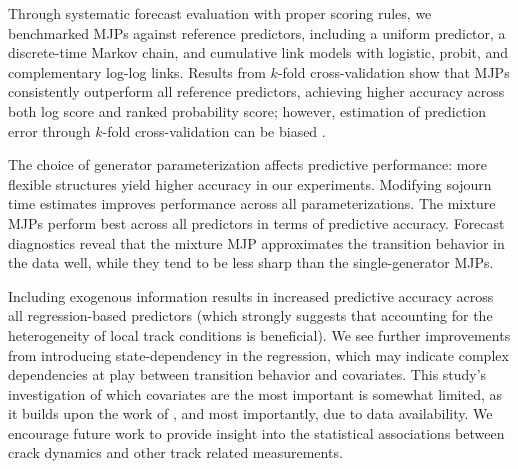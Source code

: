 \documentclass{article}
\begin{document}
Through systematic forecast evaluation with proper scoring rules, we benchmarked MJPs against reference predictors, including a uniform predictor, a discrete-time Markov chain, and cumulative link models with logistic, probit, and complementary log-log links. Results from $k$-fold cross-validation show that MJPs consistently outperform all reference predictors, achieving higher accuracy across both log score and ranked probability score; however, estimation of prediction error through $k$-fold cross-validation can be biased \citep{fushiki2011a}.

The choice of generator parameterization affects predictive performance: more flexible structures yield higher accuracy in our experiments. Modifying sojourn time estimates improves performance across all parameterizations. 
The mixture MJPs perform best across all predictors in terms of predictive accuracy. Forecast diagnostics reveal that the mixture MJP approximates the transition behavior in the data well, while they tend to be less sharp than the single-generator MJPs.

Including exogenous information results in increased predictive accuracy across all regression-based predictors (which strongly suggests that accounting for the heterogeneity of local track conditions is beneficial). We see further improvements from introducing state-dependency in the regression, which may indicate complex dependencies at play between transition behavior and covariates. This study's investigation of which covariates are the most important is somewhat limited, as it builds upon the work of \citet{bisgaard2024A}, and most importantly, due to data availability. We encourage future work to provide insight into the statistical associations between crack dynamics and other track related measurements.
\end{document}
